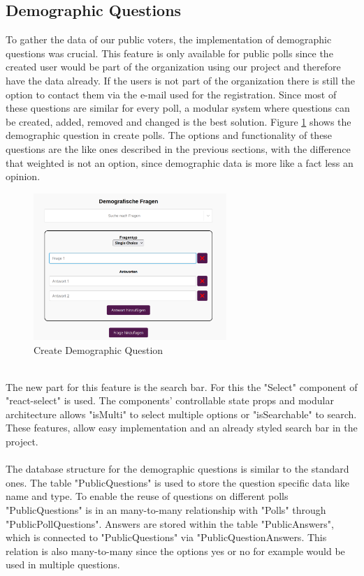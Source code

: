 \documentclass[a4paper,12pt]{report}
\begin{document}
\subsection{Demographic Questions}
To gather the data of our public voters, the implementation of demographic questions was crucial. This feature is only available for public polls since the created user would be part of the organization using our project and therefore have the data already. If the users is not part of the organization there is still the option to contact them via the e-mail used for the registration. Since most of these questions are similar for every poll, a modular system where questions can be created, added, removed and changed is the best solution. Figure \ref{fig:create_dem_que} shows the demographic question in create polls. The options and functionality of these questions are the like ones described in the previous sections, with the difference that weighted is not an option, since demographic data is more like a fact less an opinion.
\begin{figure}[h!]
	\centering
	\includegraphics[width=0.65\textwidth]{pics/demographic_question_create.jpg}
	\caption{Create Demographic Question}
	\label{fig:create_dem_que}
\end{figure}
\\
The new part for this feature is the search bar. For this the "Select" component of "react-select" is used. The components' controllable state props and modular architecture allows  "isMulti" to select multiple options or "isSearchable" to search. These features, allow easy implementation and an already styled search bar in the project. \parencite{reactselect}
\\ \\
The database structure for the demographic questions is similar to the standard ones. The table "PublicQuestions" is used to store the question specific data like name and type. To enable the reuse of questions on different polls "PublicQuestions" is in an many-to-many relationship with "Polls" through "PublicPollQuestions". Answers are stored within the table "PublicAnswers", which is connected to "PublicQuestions" via "PublicQuestionAnswers. This relation is also many-to-many since the options yes or no for example would be used in multiple questions. 
\end{document}
